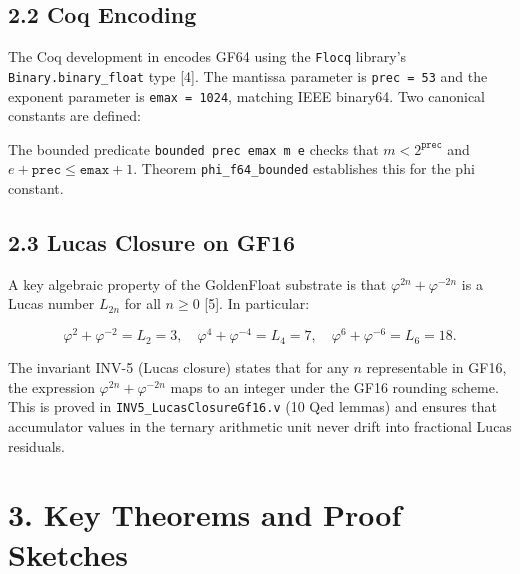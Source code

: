 \subsection{2.2 Coq
Encoding}\label{fa_06:coq-encoding}

The Coq development in
encodes GF64 using the \texttt{Flocq} library's
\texttt{Binary.binary\_float} type [4]. The
mantissa parameter is \texttt{prec\ =\ 53} and the
exponent parameter is \texttt{emax\ =\ 1024},
matching IEEE binary64. Two canonical constants
are defined:

\begin{Shaded}
\begin{Highlighting}[]
\end{Highlighting}
\end{Shaded}

The bounded predicate
\texttt{bounded\ prec\ emax\ m\ e} checks that
\(m < 2^{\mathtt{prec}}\) and
\(e + \mathtt{prec} \leq \mathtt{emax} + 1\).
Theorem \texttt{phi\_f64\_bounded} establishes
this for the phi constant.

\subsection{2.3 Lucas Closure on
GF16}\label{fa_06:lucas-closure-on-gf16}

A key algebraic property of the GoldenFloat
substrate is that \(\varphi^{2n} + \varphi^{-2n}\)
is a Lucas number \(L_{2n}\) for all \(n \geq 0\)
[5]. In particular:

\[\varphi^2 + \varphi^{-2} = L_2 = 3, \quad \varphi^4 + \varphi^{-4} = L_4 = 7, \quad \varphi^6 + \varphi^{-6} = L_6 = 18.\]

The invariant INV-5 (Lucas closure) states that
for any \(n\) representable in GF16, the
expression \(\varphi^{2n}+\varphi^{-2n}\) maps to
an integer under the GF16 rounding scheme. This is
proved in \texttt{INV5\_LucasClosureGf16.v} (10
Qed lemmas) and ensures that accumulator values in
the ternary arithmetic unit never drift into
fractional Lucas residuals.

\section{3. Key Theorems and Proof
Sketches}\label{fa_06:key-theorems-and-proof-sketches}

